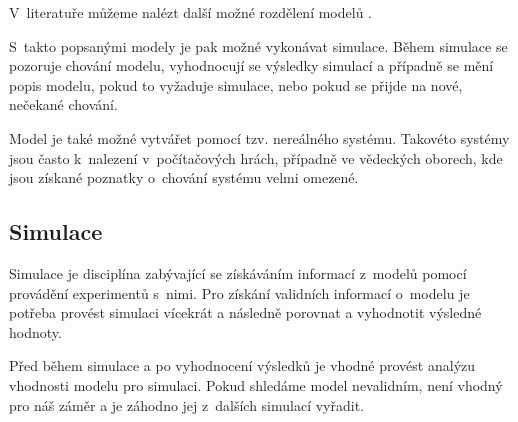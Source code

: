 V~literatuře můžeme nalézt další možné rozdělení modelů \cite{Cellierc2006}.
\newline

S~takto popsanými modely je pak možné vykonávat simulace. Během simulace se pozoruje chování modelu, vyhodnocují se výsledky simulací a případně se mění popis modelu, pokud to vyžaduje simulace, nebo pokud se přijde na nové, nečekané chování.

Model je také možné vytvářet pomocí tzv. nereálného systému. Takovéto systémy jsou často k~nalezení v~počítačových hrách, případně ve vědeckých oborech, kde jsou získané poznatky o~chování systému velmi omezené.

\subsection{Simulace}
Simulace je disciplína zabývající se získáváním informací z~modelů pomocí provádění experimentů s~nimi. Pro získání validních informací o~modelu je potřeba provést simulaci vícekrát a následně porovnat a vyhodnotit výsledné hodnoty.

Před během simulace a po vyhodnocení výsledků je vhodné provést analýzu vhodnosti modelu pro simulaci. Pokud shledáme model nevalidním, není vhodný pro náš záměr a je záhodno jej z~dalších simulací vyřadit.


